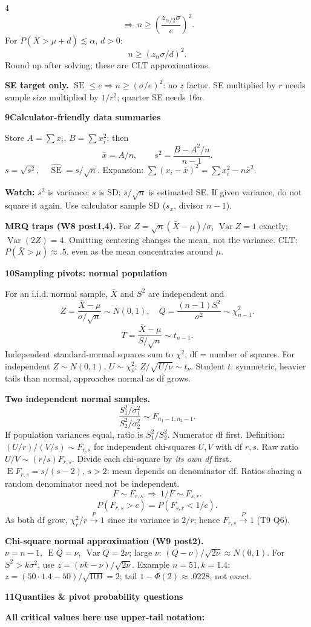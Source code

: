 \documentclass[a4paper,landscape]{article}
\newcommand{\head}[2][late]{\par\vspace{3pt}\noindent\colorbox{#1}{\parbox{\dimexpr\linewidth-6pt}{\color{white}\bfseries #2}}\par\vspace{1pt}}
\newcommand{\cue}[1]{\par\textbf{#1}\enspace}
\newcommand{\trap}[1]{\par{\color{alert}\textbf{Watch:} #1}}
\newcommand{\E}{\operatorname{E}}
\newcommand{\V}{\operatorname{Var}}
\newcommand{\SE}{\operatorname{SE}}
\newcommand{\xb}{\bar x}
\newcommand{\Xb}{\bar X}
\newcommand{\col}{\par\vfill\columnbreak}
\begin{document}
\begin{multicols*}{4}
\[ \ \Longrightarrow\ n\ge\left(\frac{z_{\alpha/2}\sigma}{e}\right)^2.\]
For \(P(\Xb>\mu+d)\lesssim\alpha\), \(d>0\):
\[n\ge(z_\alpha\sigma/d)^2.\]
Round up after solving; these are CLT approximations.
\cue{SE target only.} \(\SE\le e\Rightarrow n\ge(\sigma/e)^2\): no \(z\) factor. SE multiplied by \(r\) needs sample size multiplied by \(1/r^2\); quarter SE needs \(16n\).
\head{9\quad Calculator-friendly data summaries}
Store \(A=\sum x_i\), \(B=\sum x_i^2\); then
\[\xb=A/n,\qquad s^2=\frac{B-A^2/n}{n-1}.\]
\(s=\sqrt{s^2},\quad\widehat{\SE}=s/\sqrt n\).
Expansion: \(\sum(x_i-\xb)^2=\sum x_i^2-n\xb^2\).
\trap{\(s^2\) is variance; \(s\) is SD; \(s/\sqrt n\) is estimated SE. If given variance, do not square it again. Use calculator sample SD (\(s_x\), divisor \(n-1\)).}
\cue{MRQ traps (W8 post1,4).} For \(Z=\sqrt n(\Xb-\mu)/\sigma\), \(\V Z=1\) exactly; \(\V(2Z)=4\). Omitting centering changes the mean, not the variance. CLT: \(P(\Xb>\mu)\approx.5\), even as the mean concentrates around \(\mu\).
\col
\head{10\quad Sampling pivots: normal population}
For an i.i.d. normal sample, \(\Xb\) and \(S^2\) are independent and
\[Z=\frac{\Xb-\mu}{\sigma/\sqrt n}\sim N(0,1),\quad
 Q=\frac{(n-1)S^2}{\sigma^2}\sim\chi^2_{n-1}.\]
\[T=\frac{\Xb-\mu}{S/\sqrt n}\sim t_{n-1}.\]
Independent standard-normal squares sum to \(\chi^2\), df = number of squares. For independent \(Z\sim N(0,1)\), \(U\sim\chi^2_\nu\): \(Z/\sqrt{U/\nu}\sim t_\nu\). Student \(t\): symmetric, heavier tails than normal, approaches normal as df grows.
\cue{Two independent normal samples.}
\[\frac{S_1^2/\sigma_1^2}{S_2^2/\sigma_2^2}
 \sim F_{n_1-1,n_2-1}.\]
If population variances equal, ratio is \(S_1^2/S_2^2\). Numerator df first. Definition: \((U/r)/(V/s)\sim F_{r,s}\) for independent chi-squares \(U,V\) with df \(r,s\).
Raw ratio \(U/V\sim(r/s)F_{r,s}\). Divide each chi-square by \emph{its own df} first. \(\E F_{r,s}=s/(s-2)\), \(s>2\): mean depends on denominator df. Ratios sharing a random denominator need not be independent.
\[F\sim F_{r,s}\ \Rightarrow\ 1/F\sim F_{s,r}.\]
\[P(F_{r,s}>c)=P(F_{s,r}<1/c).\]
As both df grow, \(\chi^2_r/r\xrightarrow{P}1\) since its variance is \(2/r\); hence \(F_{r,s}\xrightarrow{P}1\) (T9 Q6).
\cue{Chi-square normal approximation (W9 post2).}
\(\nu=n-1,\ \E Q=\nu,\ \V Q=2\nu\); large \(\nu\): \((Q-\nu)/\sqrt{2\nu}\approx N(0,1)\). For \(S^2>k\sigma^2\), use \(z=(\nu k-\nu)/\sqrt{2\nu}\). Example \(n=51,k=1.4\): \(z=(50\cdot1.4-50)/\sqrt{100}=2\); tail \(1-\Phi(2)\approx.0228\), not exact.
\head{11\quad Quantiles \& pivot probability questions}
\textbf{All critical values here use upper-tail notation:}\par

\end{multicols*}
\end{document}
